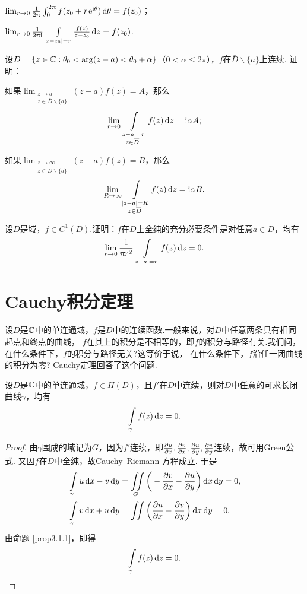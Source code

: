 \begin{xiti}
    \begin{enuma}
      \item $\lim_{r\to0}\frac1{2\uppi}\int_0^{2\uppi}f(z_0+r\operatorname{\!\!\;\mathrm e}^{\mathrm i\theta})\mathop{}\!\mathrm{d}\theta=f(z_0)$；
      \item $\lim_{r\to0}\frac1{2\uppi\mathrm i}\int\limits_{|z-z_0|=r}\frac{f(z)}{z-z_0}\mathop{}\!\mathrm dz=f(z_0)$.
    \end{enuma}
  \item 设$D=\{z\in\mathbb C:\theta_0<\arg(z-a)<\theta_0+\alpha\}$（$0<\alpha\le2\pi$），$f$在$\bar D\backslash\{a\}$上连续. 证明：
    \begin{enuma}
      \item 如果$\lim_{\substack{z\to a\\z\in\bar D\backslash\{a\}}}(z-a)f(z)=A$，那么
        \[
          \lim_{r\to0}\int\limits_{\substack{|z-a| = r\\z\in{}\mkern1mu\overline{\mkern-1muD}}}f(z)\mathop{}\!\mathrm dz = \mathrm i\alpha A;
        \]
      \item 如果$\lim_{\substack{z\to \infty\\z\in\bar D\backslash\{a\}}}(z-a)f(z)=B$，那么
        \[
          \lim_{R\to\infty}\int\limits_{\substack{|z-a|=R\\z\in {}\mkern1mu\overline{\mkern-1muD}}}f(z)\mathop{}\!\mathrm dz = \mathrm i\alpha B.
        \]
    \end{enuma}
  \item 设$D$是域，$f\in C^1(D)$.证明：$f$在$D$上全纯的充分必要条件是对任意$a\in D$，均有
   \[
     \lim_{r\to0} \frac1{\uppi r^2} \int\limits_{|z-a|=r}f(z)\mathop{}\!\mathrm dz = 0.
   \]
\end{xiti}

\section{Cauchy积分定理\label{sec3.2}}
设$D$是$\mathbb C$中的单连通域，$f$是$D$中的连续函数.一般来说，对$D$中任意两条具有相同起点和终点的曲线，
$f$在其上的积分是不相等的，即$f$的积分与路径有关.我们问，在什么条件下，$f$的积分与路径无关?这等价于说，
在什么条件下，$f$沿任一闭曲线的积分为零? Cauchy定理回答了这个问题.
\begin{theorem}\label{thm3.2.1}
  设$D$是$\mathbb C$中的单连通域，$f\in H(D)$，且$f'$在$D$中连续，则对$D$中任意的可求长闭曲线$\gamma$，均有
  \[
    \int\limits_\gamma f(z)\mathop{}\!\mathrm dz = 0.
  \]
\end{theorem}
\begin{proof}
  由$\gamma$围成的域记为$G$，因为$f'$连续，即$\frac{\partial u}{\partial x},\frac{\partial v}{\partial x},\frac{\partial u}{\partial y},\frac{\partial v}{\partial y}$连续，故可用Green公式.
  又因$f$在$D$中全纯，故Cauchy--Riemann 方程成立. 于是
  \begin{align*}
    & \int\limits_\gamma u\dx-v\dy = \iint\limits_G\bigg(-\pp vx-\pp uy\bigg)\dx\dy = 0,\\
    & \int\limits_\gamma v\dx+u\dy = \iint\limits\bigg(\pp ux-\pp vy\bigg)\dx\dy = 0.
  \end{align*}
  由命题 \ref{prop3.1.1}，即得
  \begin{equation*}
    \int\limits_\gamma f(z)\mathop{}\!\mathrm dz = 0. \qedhere
  \end{equation*}
\end{proof}

